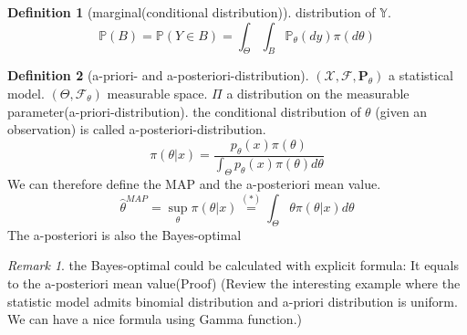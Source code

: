 \documentclass[a4paper,12pt, oneside, fleqn]{book}
\theoremstyle{definition}
\newtheorem{definition}{Definition}[section]
\theoremstyle{remark}
\newtheorem*{remark}{Remark}
\begin{document}
\begin{definition}[marginal(conditional distribution)]
distribution of $\mathbb{Y}$.
\begin{equation*}
	\mathbb{P}(B) = \mathbb{P}(Y \in B) = \int_\Theta \int_B \mathbb{P}_\theta(dy) \pi(d\theta)
\end{equation*}
\end{definition}




\begin{definition}[a-priori- and a-posteriori-distribution]
\((\mathcal{X}, \mathcal{F}, \mathbf{P}_{\theta})\) a statistical model. \((\Theta, \mathcal{F}_{\theta})\) measurable space.
 \(\Pi\) a distribution on the measurable parameter(a-priori-distribution).
    the conditional distribution of \(\theta \) (given an observation) is called a-posteriori-distribution. 
        \begin{equation*}
    	\pi(\theta|x) = \frac{p_\theta(x)\pi(\theta)	}{\int_\Theta p_\theta(x) \pi(\theta) d\theta}
    \end{equation*}
    We can therefore define the MAP and the a-posteriori mean value.
    \begin{equation*}
    	\hat{\theta}^{MAP} = \sup_\theta \pi(\theta|x) \overset{(*)}{=}\int_\Theta \theta \pi(\theta|x)d\theta
    \end{equation*}
The a-posteriori is also the Bayes-optimal

\end{definition}


\begin{remark}
the Bayes-optimal could be calculated with explicit formula: It equals to the a-posteriori mean value(Proof) (Review the interesting example where the statistic model admits binomial distribution and a-priori distribution is uniform. We can have a nice formula using Gamma function.)

\end{remark}
\end{document}
